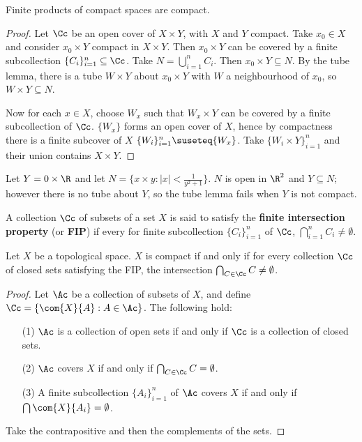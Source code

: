 \begin{theorem}\label{3.4.7}
    Finite products of compact spaces are compact.
\end{theorem}
\begin{proof}
    Let $\Cc$ be an open cover of  $X \times Y$, with  $X$ and  $Y$ compact. Take  $x_0 \in X$ and
    consider $x_0 \times Y$ compact in $X \times Y$. Then  $x_0 \times Y$ can be covered by a finite
    subcollection $\{C_i\}_{i=1}^n \subseteq \Cc$. Take $N=\bigcup_{i=1}^n{C_i}$. Then $x_0 \times Y
    \subseteq N$. By the tube lemma, there is a tube $W \times Y$ about  $x_0 \times Y$ with $W$ a
    neighbourhood of  $x_0$, so $W \times Y \subseteq N$.

    Now for each $x \in X$, choose  $W_x$ such that  $W_x \times Y$ can be covered by a finite
    subcollection of  $\Cc$. $\{W_x\}$ forms an open cover of $X$, hence by compactness there is a
    finite subcover of  $X$  $\{W_i\}_{i=1}^n \suseteq \{W_x\}$. Take $\{W_i \times Y\}_{i=1}^n$ and
    their union contains $X \times Y$.
\end{proof}

\begin{example}
    Let $Y=0 \times \R$ and let  $N=\{x \times y: |x|<\frac{1}{y^2+1}\}$. $N$ is open in  $\R^2$ and
     $Y \subseteq N$; however there is no tube about  $Y$, so the tube lemma fails when  $Y$ is not
     compact.
\end{example}

\begin{definition}
    A collection $\Cc$ of subsets of a set  $X$ is said to satisfy the  \textbf{finite intersection
    property} (or \textbf{FIP}) if every for finite subcollection $\{C_i\}_{i=1}^n$ of $\Cc$,
    $\bigcap_{i=1}^n{C_i} \neq \emptyset$.
\end{definition}

\begin{theorem}\label{3.4.8}
    Let $X$ be a topological space.  $X$ is compact if and only if for every collection  $\Cc$ of
    closed sets satisfying the FIP, the intersection $\bigcap_{C \in \Cc}{C} \neq \emptyset$.
\end{theorem}
\begin{proof}
    Let $\Ac$ be a collection of subsets of  $X$, and define  $\Cc=\{\com{X}{A}:A \in \Ac\}$. The
    following hold:
    \begin{enumerate}
        \item[(1)] $\Ac$ is a collection of open sets if and only if $\Cc$ is a collection of closed
            sets.

        \item [(2)] $\Ac$ covers  $X$ if and only if  $\bigcap_{C \in \Cc}{C}=\emptyset$.

        \item[(3)] A finite subcollection $\{A_i\}_{i=1}^n$ of $\Ac$ covers  $X$ if and only if
            $\bigcap{\com{X}{A_i}}=\emptyset$.
    \end{enumerate}
    Take the contrapositive and then the complements of the sets.
\end{proof}
